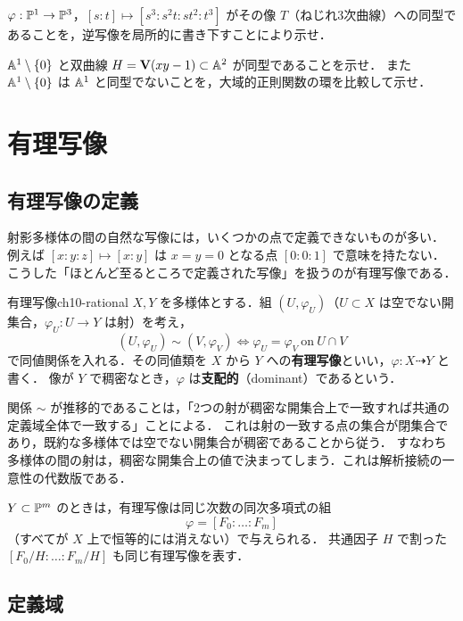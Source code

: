$\varphi:\mathbb{P}^1\to\mathbb{P}^3$，$[s:t]\mapsto[s^3:s^2t:st^2:t^3]$ がその像 $T$（ねじれ3次曲線）への同型であることを，逆写像を局所的に書き下すことにより示せ．

$\mathbb{A}^1\setminus\{0\}$ と双曲線 $H=\mathbf{V}(xy-1)\subset\mathbb{A}^2$ が同型であることを示せ．
また $\mathbb{A}^1\setminus\{0\}$ は $\mathbb{A}^1$ と同型でないことを，大域的正則関数の環を比較して示せ．

\section{有理写像}

\subsection{有理写像の定義}

射影多様体の間の自然な写像には，いくつかの点で定義できないものが多い．
例えば $[x:y:z]\mapsto[x:y]$ は $x=y=0$ となる点 $[0:0:1]$ で意味を持たない．
こうした「ほとんど至るところで定義された写像」を扱うのが有理写像である．

\begin{mydef}{有理写像}{ch10-rational}
$X,Y$ を多様体とする．組 $(U,\varphi_U)$（$U\subset X$ は空でない開集合，$\varphi_U:U\to Y$ は射）を考え，
\[
  (U,\varphi_U)\sim(V,\varphi_V)\iff \varphi_U=\varphi_V\ \text{on}\ U\cap V
\]
で同値関係を入れる．その同値類を $X$ から $Y$ への\textbf{有理写像}といい，$\varphi:X\dashrightarrow Y$ と書く．
像が $Y$ で稠密なとき，$\varphi$ は\textbf{支配的}（dominant）であるという．
\end{mydef}

関係 $\sim$ が推移的であることは，「2つの射が稠密な開集合上で一致すれば共通の定義域全体で一致する」ことによる．
これは射の一致する点の集合が閉集合であり，既約な多様体では空でない開集合が稠密であることから従う．
すなわち多様体の間の射は，稠密な開集合上の値で決まってしまう．これは解析接続の一意性の代数版である．

$Y\subset\mathbb{P}^m$ のときは，有理写像は同じ次数の同次多項式の組
\[
  \varphi=[F_0:\dots:F_m]
\]
（すべてが $X$ 上で恒等的には消えない）で与えられる．
共通因子 $H$ で割った $[F_0/H:\dots:F_m/H]$ も同じ有理写像を表す．

\subsection{定義域}

